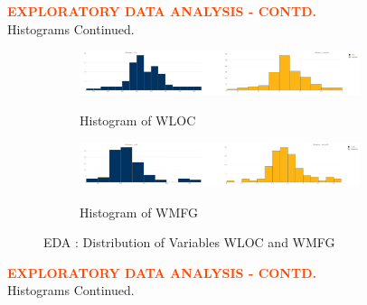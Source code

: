 \pagebreak

\textbf{\textcolor{OrangeRed}{EXPLORATORY DATA ANALYSIS - CONTD.}}\\

Histograms Continued.\\

\begin{figure}[!ht]
	\begin{subfigure}[b]{1.0\textwidth}
		\centering
		\includegraphics[width=0.9\textwidth,height=0.30\textheight]{images/EDA_histograms_wloc.jpg}
		\label{fig:EDA Histogram WLOC}
		\caption{Histogram of WLOC}
	\end{subfigure}\vspace{3mm}%
	
	\begin{subfigure}[b]{1.0\textwidth}
		\centering
		\includegraphics[width=0.9\textwidth,height=0.30\textheight]{images/EDA_histograms_wmfg.jpg}
		\label{fig:EDA Histogram WMFG}
		\caption{Histogram of WMFG}
	\end{subfigure}
	\label{fig:WLOC and WMFG Histogram}
	\caption{EDA : Distribution of Variables WLOC and WMFG}
\end{figure}

\pagebreak

\textbf{\textcolor{OrangeRed}{EXPLORATORY DATA ANALYSIS - CONTD.}}\\

Histograms Continued.\\


